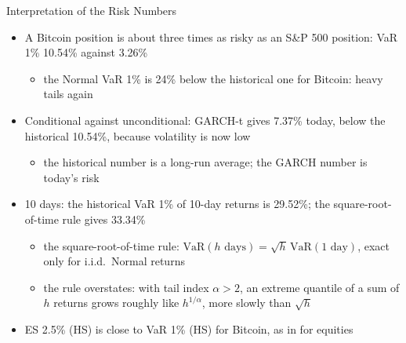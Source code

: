 \begin{frame}{Interpretation of the Risk Numbers}
\itemsize{\small}
\begin{itemize}
    \item A Bitcoin position is about three times as risky as an S\&P 500 position: VaR 1\% 10.54\% against 3.26\%
    \begin{itemize}
        \item the Normal VaR 1\% is 24\% below the historical one for Bitcoin: heavy tails again
    \end{itemize}
    \item Conditional against unconditional: GARCH-t gives 7.37\% today, below the historical 10.54\%, because volatility is now low
    \begin{itemize}
        \item the historical number is a long-run average; the GARCH number is today's risk
    \end{itemize}
    \item 10 days: the historical VaR 1\% of 10-day returns is 29.52\%; the square-root-of-time rule gives 33.34\%
    \begin{itemize}
        \item the square-root-of-time rule: $\mathrm{VaR}(h\text{ days}) = \sqrt{h}\,\mathrm{VaR}(1\text{ day})$, exact only for i.i.d.\ Normal returns
        \item the rule overstates: with tail index $\alpha > 2$, an extreme quantile of a sum of $h$ returns grows roughly like $h^{1/\alpha}$, more slowly than $\sqrt{h}$
    \end{itemize}
    \item ES 2.5\% (HS) is close to VaR 1\% (HS) for Bitcoin, as in  for equities
\end{itemize}
\end{frame}

